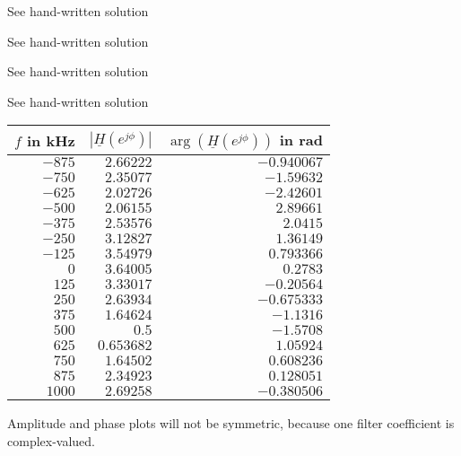 \begin{solution}
	\begin{tasks}
		\task
		See hand-written solution
		
		\task
		See hand-written solution
		
		\task
		See hand-written solution
		
		\task
		See hand-written solution
		
		\task
		\begin{table}[H]
			\centering
			\begin{tabular}{|r|r|r|}
				\hline
				$f$ in \si{kHz} & $\left|\underline{H}\left(e^{j\phi}\right)\right|$ & $\arg\left(\underline{H}\left(e^{j\phi}\right)\right)$ in \si{rad} \\
				\hline
				\hline
				$-875$ & $2.66222$ & $-0.940067$ \\
				\hline
				$-750$ & $2.35077$ & $-1.59632$ \\
				\hline
				$-625$ & $2.02726$ & $-2.42601$ \\
				\hline
				$-500$ & $2.06155$ & $2.89661$ \\
				\hline
				$-375$ & $2.53576$ & $2.0415$ \\
				\hline
				$-250$ & $3.12827$ & $1.36149$ \\
				\hline
				$-125$ & $3.54979$ & $0.793366$ \\
				\hline
				$0$ & $3.64005$ & $0.2783$ \\
				\hline
				$125$ & $3.33017$ & $-0.20564$ \\
				\hline
				$250$ & $2.63934$ & $-0.675333$ \\
				\hline
				$375$ & $1.64624$ & $-1.1316$ \\
				\hline
				$500$ & $0.5$ & $-1.5708$ \\
				\hline
				$625$ & $0.653682$ & $1.05924$ \\
				\hline
				$750$ & $1.64502$ & $0.608236$ \\
				\hline
				$875$ & $2.34923$ & $0.128051$ \\
				\hline
				$1000$ & $2.69258$ & $-0.380506$ \\
				\hline
			\end{tabular}
		\end{table}
	
		Amplitude and phase plots will not be symmetric, because one filter coefficient is complex-valued.
	

\end{tasks}
\end{solution}
